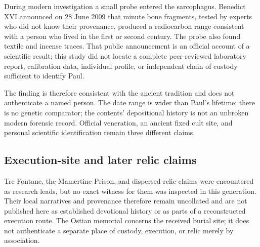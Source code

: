During modern investigation a small probe entered the sarcophagus. Benedict
XVI announced on 28 June 2009 that minute bone fragments, tested by experts
who did not know their provenance, produced a radiocarbon range consistent
with a person who lived in the first or second century. The probe also found
textile and incense traces. That public announcement is an official account
of a scientific result; this study did not locate a complete peer-reviewed
laboratory report, calibration data, individual profile, or independent chain
of custody sufficient to identify Paul.

The finding is therefore consistent with the ancient tradition and does not
authenticate a named person. The date range is wider than Paul's lifetime;
there is no genetic comparator; the contents' depositional history is not an
unbroken modern forensic record. Official veneration, an ancient fixed cult
site, and personal scientific identification remain three different claims.

\subsection{Execution-site and later relic claims}

Tre Fontane, the Mamertine Prison, and dispersed relic claims were encountered
as research leads, but no exact witness for them was inspected in this
generation. Their local narratives and provenance therefore remain uncollated
and are not published here as established devotional history or as parts of a
reconstructed execution route. The Ostian memorial concerns the received
burial site; it does not authenticate a separate place of custody, execution,
or relic merely by association.

